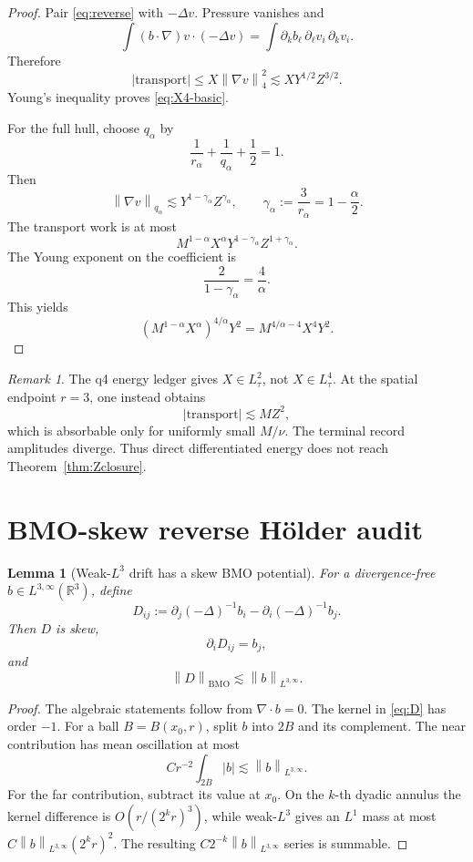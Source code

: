 \documentclass[11pt]{article}
\newtheorem{lemma}[theorem]{Lemma}
\theoremstyle{remark}
\newtheorem{remark}[theorem]{Remark}
\newcommand{\R}{\mathbb R}
\newcommand{\norm}[1]{\left\|#1\right\|}
\begin{document}
\begin{proof}
Pair \eqref{eq:reverse} with \(-\Delta v\).  Pressure vanishes and
\[
 \int(b\cdot\nabla)v\cdot(-\Delta v)
 =
 \int
 \partial_kb_\ell\,\partial_\ell v_i\,\partial_kv_i.
\]
Therefore
\[
 |\text{transport}|
 \leq
 X\norm{\nabla v}_4^2
 \lesssim
 XY^{1/2}Z^{3/2}.
\]
Young's inequality proves \eqref{eq:X4-basic}.

For the full hull, choose \(q_\alpha\) by
\[
 \frac1{r_\alpha}+\frac1{q_\alpha}+\frac12=1.
\]
Then
\[
 \norm{\nabla v}_{q_\alpha}
 \lesssim
 Y^{1-\gamma_\alpha}Z^{\gamma_\alpha},
 \qquad
 \gamma_\alpha:=\frac3{r_\alpha}=1-\frac{\alpha}{2}.
\]
The transport work is at most
\[
 M^{1-\alpha}X^\alpha
 Y^{1-\gamma_\alpha}Z^{1+\gamma_\alpha}.
\]
The Young exponent on the coefficient is
\[
 \frac2{1-\gamma_\alpha}=\frac4\alpha.
\]
This yields
\[
 \left(M^{1-\alpha}X^\alpha\right)^{4/\alpha}Y^2
 =
 M^{4/\alpha-4}X^4Y^2.
\]
\end{proof}

\begin{remark}
The q4 energy ledger gives \(X\in L^2_\tau\), not \(X\in L^4_\tau\).
At the spatial endpoint \(r=3\), one instead obtains
\[
 |\text{transport}|\lesssim MZ^2,
\]
which is absorbable only for uniformly small \(M/\nu\).  The terminal
record amplitudes diverge.  Thus direct differentiated energy does not
reach Theorem~\ref{thm:Zclosure}.
\end{remark}

\section{BMO-skew reverse H\"older audit}

\begin{lemma}[Weak-\(L^3\) drift has a skew BMO potential]
\label{lem:BMO-potential}
For a divergence-free \(b\in L^{3,\infty}(\R^3)\), define
\begin{equation}
\label{eq:D}
 D_{ij}
 :=
 \partial_j(-\Delta)^{-1}b_i
 -\partial_i(-\Delta)^{-1}b_j.
\end{equation}
Then \(D\) is skew,
\[
 \partial_iD_{ij}=b_j,
\]
and
\begin{equation}
\label{eq:BMO-bound}
 \norm{D}_{\mathrm{BMO}}
 \lesssim
 \norm{b}_{L^{3,\infty}}.
\end{equation}
\end{lemma}

\begin{proof}
The algebraic statements follow from
\(\nabla\cdot b=0\).  The kernel in \eqref{eq:D} has order \(-1\).
For a ball \(B=B(x_0,r)\), split \(b\) into \(2B\) and its complement.
The near contribution has mean oscillation at most
\[
 Cr^{-2}\int_{2B}|b|
 \lesssim
 \norm{b}_{L^{3,\infty}}.
\]
For the far contribution, subtract its value at \(x_0\).  On the
\(k\)-th dyadic annulus the kernel difference is
\(O(r/(2^kr)^3)\), while weak-\(L^3\) gives an \(L^1\) mass at most
\(C\norm{b}_{L^{3,\infty}}(2^kr)^2\).  The resulting
\(C2^{-k}\norm{b}_{L^{3,\infty}}\) series is summable.
\end{proof}
\end{document}
